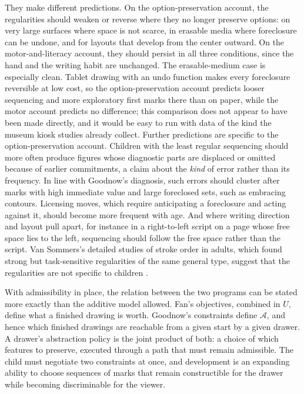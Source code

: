 \documentclass[11pt]{article}
\theoremstyle{remark}
\newcommand{\A}{\mathcal{A}}
\begin{document}
They make different predictions. On the option-preservation account, the regularities should weaken or reverse where they no longer preserve options: on very large surfaces where space is not scarce, in erasable media where foreclosure can be undone, and for layouts that develop from the center outward. On the motor-and-literacy account, they should persist in all three conditions, since the hand and the writing habit are unchanged. The erasable-medium case is especially clean. Tablet drawing with an undo function makes every foreclosure reversible at low cost, so the option-preservation account predicts looser sequencing and more exploratory first marks there than on paper, while the motor account predicts no difference; this comparison does not appear to have been made directly, and it would be easy to run with data of the kind the museum kiosk studies already collect. Further predictions are specific to the option-preservation account. Children with the least regular sequencing should more often produce figures whose diagnostic parts are displaced or omitted because of earlier commitments, a claim about the \emph{kind} of error rather than its frequency. In line with Goodnow's diagnosis, such errors should cluster after marks with high immediate value and large foreclosed sets, such as embracing contours. Licensing moves, which require anticipating a foreclosure and acting against it, should become more frequent with age. And where writing direction and layout pull apart, for instance in a right-to-left script on a page whose free space lies to the left, sequencing should follow the free space rather than the script. Van Sommers's detailed studies of stroke order in adults, which found strong but task-sensitive regularities of the same general type, suggest that the regularities are not specific to children \cite{vansommers1984}.

With admissibility in place, the relation between the two programs can be stated more exactly than the additive model allowed. Fan's objectives, combined in $U$, define what a finished drawing is worth. Goodnow's constraints define $\A$, and hence which finished drawings are reachable from a given start by a given drawer. A drawer's abstraction policy is the joint product of both: a choice of which features to preserve, executed through a path that must remain admissible. The child must negotiate two constraints at once, and development is an expanding ability to choose sequences of marks that remain constructible for the drawer while becoming discriminable for the viewer.
\end{document}
